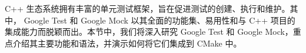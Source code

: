 C++ 生态系统拥有丰富的单元测试框架，旨在促进测试的创建、执行和维护。其中， Google Test 和 Google Mock 以其全面的功能集、易用性和与 C++ 项目的集成能力而脱颖而出。本节中，我们将深入研究 Google Test 和 Google Mock，重点介绍其主要功能和语法，并演示如何将它们集成到 CMake 中。


